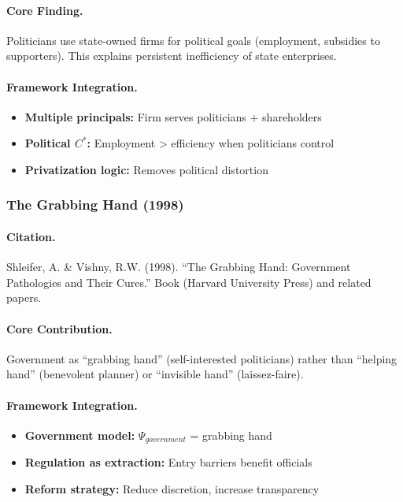 \paragraph{Core Finding.}
Politicians use state-owned firms for political goals (employment, subsidies
to supporters). This explains persistent inefficiency of state enterprises.

\paragraph{Framework Integration.}
\begin{itemize}
  \item \textbf{Multiple principals:} Firm serves politicians + shareholders
  \item \textbf{Political $C^*$:} Employment > efficiency when politicians control
  \item \textbf{Privatization logic:} Removes political distortion
\end{itemize}

\subsubsection{The Grabbing Hand (1998)}

\paragraph{Citation.}
Shleifer, A. \& Vishny, R.W. (1998).
``The Grabbing Hand: Government Pathologies and Their Cures.''
Book (Harvard University Press) and related papers.

\paragraph{Core Contribution.}
Government as ``grabbing hand'' (self-interested politicians) rather than
``helping hand'' (benevolent planner) or ``invisible hand'' (laissez-faire).

\paragraph{Framework Integration.}
\begin{itemize}
  \item \textbf{Government model:} $\Psi_{government}$ = grabbing hand
  \item \textbf{Regulation as extraction:} Entry barriers benefit officials
  \item \textbf{Reform strategy:} Reduce discretion, increase transparency
\end{itemize}

